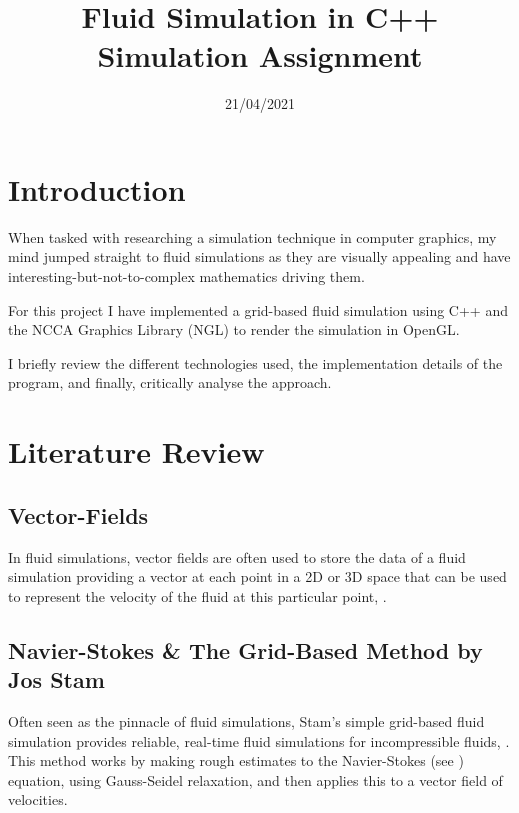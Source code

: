\documentclass[notitlepage,12pt]{article}
\title{%
Fluid Simulation in C++ \\
\large Simulation Assignment}
\date{21/04/2021}
\begin{document}
\maketitle




\section{Introduction}

When tasked with researching a simulation technique in computer graphics, my mind jumped straight to fluid simulations as they are visually appealing and have interesting-but-not-to-complex mathematics driving them.

For this project I have implemented a grid-based fluid simulation using C++ and the NCCA Graphics Library (NGL) to render the simulation in OpenGL. 

I briefly review the different technologies used, the implementation details of the program, and finally, critically analyse the approach.

\section{Literature Review}

\subsection{Vector-Fields}

In fluid simulations, vector fields are often used to store the data of a fluid simulation providing a vector at each point in a 2D or 3D space that can be used to represent the velocity of the fluid at this particular point, \cite{galbis2012vector}.

\subsection{Navier-Stokes \& The Grid-Based Method by Jos Stam}

Often seen as the pinnacle of fluid simulations, Stam's simple grid-based fluid simulation provides reliable, real-time fluid simulations for incompressible fluids, \cite{stam2003real}. This method works by making rough estimates to the Navier-Stokes (see \cite{temam2001navier}) equation, using Gauss-Seidel relaxation, and then applies this to a vector field of velocities. 
\end{document}

